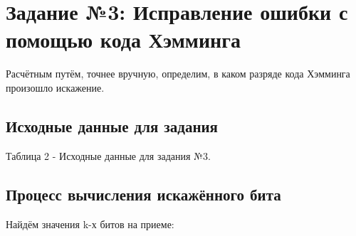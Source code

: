 \documentclass[11pt]{article}
\begin{document}
\newpage
\section{Задание №3: Исправление ошибки с помощью кода Хэмминга}
Расчётным путём, точнее вручную, определим, в каком разряде кода Хэмминга произошло искажение. 
\subsection{Исходные данные для задания}
\begin{table}[H]
    \end{table}
\begin{center}
        Таблица 2 - Исходные данные для задания №3.
\end{center}

\subsection{Процесс вычисления искажённого бита}
Найдём значения k-х битов на приеме:
\end{document}
